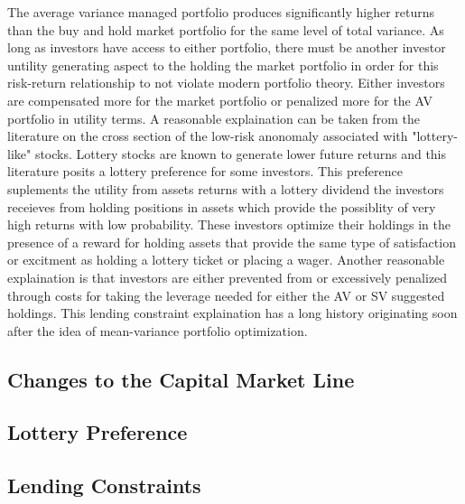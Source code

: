 The average variance managed portfolio produces significantly higher returns than the buy and hold market portfolio for the same level of total variance. As long as investors have access to either portfolio, there must be another investor untility generating aspect to the holding the market portfolio in order for this risk-return relationship to not violate modern portfolio theory. Either investors are compensated more for the market portfolio or penalized more for the AV portfolio in utility terms. A reasonable explaination can be taken from the literature on the cross section of the low-risk anonomaly associated with "lottery-like" stocks. Lottery stocks are known to generate lower future returns and this literature posits a lottery preference for some investors. \citep{barberis_stocks_2008} This preference suplements the utility from assets returns with a lottery dividend the investors receieves from holding positions in assets which provide the possiblity of very high returns with low probability. These investors optimize their holdings in the presence of a reward for holding assets that provide the same type of satisfaction or excitment as holding a lottery ticket or placing a wager. Another reasonable explaination is that investors are either prevented from or excessively penalized through costs for taking the leverage needed for either the AV or SV suggested holdings. This lending constraint explaination has a long history originating soon after the idea of mean-variance portfolio optimization.

\subsection{Changes to the Capital Market Line}


\subsection{Lottery Preference}


\subsection{Lending Constraints}
